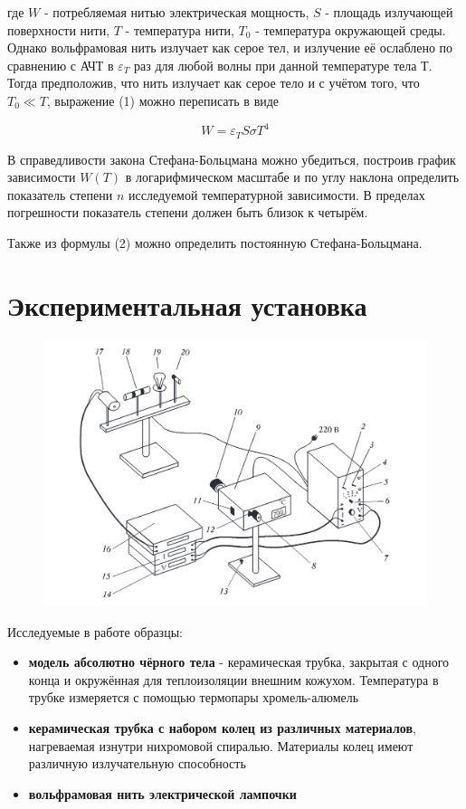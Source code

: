 \documentclass[a4paper, 12pt]{article}
\begin{document}
    где $W$ - потребляемая нитью электрическая мощность, $S$ - площадь излучающей поверхности нити, 
    $T$ - температура нити, $T_0$ - температура окружающей среды. 
    Однако вольфрамовая нить излучает как серое тел, и излучение её ослаблено по сравнению с АЧТ 
    в $\varepsilon_T$ раз для любой волны при данной температуре тела Т. 
    Тогда предположив, что нить излучает как серое тело и с учётом того, что $T_0 \ll T$, выражение (1) можно переписать в виде
    
    \begin{equation}
        W = \varepsilon_T S \sigma T^4
    \end{equation}

    В справедливости закона Стефана-Больцмана можно убедиться, построив график зависимости $W(T)$ в 
    логарифмическом масштабе и по углу наклона определить показатель степени $n$ исследуемой    температурной зависимости. 
    В пределах погрешности показатель степени должен быть близок к четырём. \par
    Также из формулы (2) можно определить постоянную Стефана-Больцмана.

    \section{Экспериментальная установка}

    \begin{figure}[H]
        \centering
        \includegraphics[width=0.7\linewidth]{res/2.png}
    \end{figure}

    Исследуемые в работе образцы:
    \begin{itemize}
        \item \textbf{модель абсолютно чёрного тела} - керамическая трубка, закрытая 
        с одного конца и окружённая для теплоизоляции внешним кожухом. 
        Температура в трубке измеряется с помощью термопары хромель-алюмель
        \item \textbf{керамическая трубка с набором колец из различных материалов}, 
        нагреваемая изнутри нихромовой спиралью. Материалы колец имеют различную излучательную способность
        \item \textbf{вольфрамовая нить электрической лампочки}
    \end{itemize}
\end{document}
